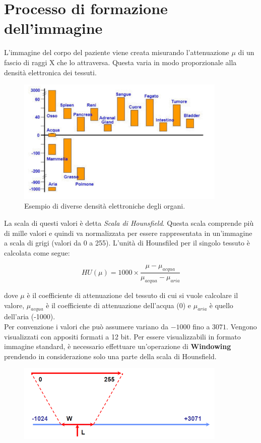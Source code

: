 \section{Processo di formazione dell'immagine}

L'immagine del corpo del paziente viene creata misurando
l'attenuazione $\mu$ di un fascio di raggi X che lo attraversa. Questa
varia in modo proporzionale alla densità elettronica dei tessuti.

\begin{figure}[H]
    \centering
    \includegraphics[width=10cm, keepaspectratio]{capitoli/immagini/imgs/ossascala.png}
    \caption{Esempio di diverse densità elettroniche degli organi.}
\end{figure}

La scala di questi valori è detta \textit{Scala di Hounsfield}.
Questa scala comprende più di mille valori e quindi va normalizzata per
essere rappresentata in un'immagine a scala di grigi (valori da 0 a 255).
L'unità di Hounsfiled per il singolo tessuto è calcolata come segue:

$$
    HU(\mu) = 1000 \times \frac{\mu - \mu_{acqua}}{\mu_{acqua} - \mu_{aria}}
$$

dove $\mu$ è il coefficiente di attenuazione del tessuto di cui si vuole calcolare il valore,
$\mu_{acqua}$ è il coefficiente di attenuazione dell'acqua (0) e $\mu_{aria}$ è
quello dell'aria (-1000).\\

Per convenzione i valori che può assumere variano da $-1000$ fino a $3071$. Vengono
visualizzati con appositi formati a 12 bit. Per essere visualizzabili in formato
immagine standard, è necessario effettuare un'operazione di \textbf{Windowing} prendendo in
considerazione solo una parte della scala di Hounsfield.

\begin{figure}[H]
    \centering
    \includegraphics[width=10cm, keepaspectratio]{capitoli/immagini/imgs/hunsfield.png}
\end{figure}

